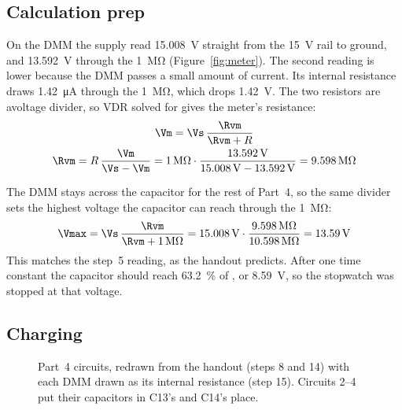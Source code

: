 \documentclass[offwhitecover]{lennylab}
\begin{document}
\subsection{Calculation prep}

On the DMM the supply read \qty{15.008}{\volt} straight from the \qty{+15}{\volt} rail to ground, and \qty{13.592}{\volt} through the \qty{1}{\mega\ohm} (Figure~\ref{fig:meter}). The second reading is lower because the DMM passes a small amount of current. Its internal resistance \Rvm{} draws \qty{1.42}{\micro\ampere} through the \qty{1}{\mega\ohm}, which drops \qty{1.42}{\volt}. The two resistors are a\pagebreak[3] voltage divider, so VDR solved for \Rvm{} gives the meter's resistance:
\begin{gather}
  \Vm = \Vs\,\frac{\Rvm}{\Rvm + R} \\
  \Rvm = R\,\frac{\Vm}{\Vs - \Vm}
       = \qty{1}{\mega\ohm} \cdot \frac{\qty{13.592}{\volt}}{\qty{15.008}{\volt} - \qty{13.592}{\volt}}
       = \qty{9.598}{\mega\ohm}
\end{gather}

The DMM stays across the capacitor for the rest of Part~4, so the same divider sets the highest voltage the capacitor can reach through the \qty{1}{\mega\ohm}:
\begin{equation}
  \Vmax = \Vs\,\frac{\Rvm}{\Rvm + \qty{1}{\mega\ohm}}
        = \qty{15.008}{\volt} \cdot \frac{\qty{9.598}{\mega\ohm}}{\qty{10.598}{\mega\ohm}}
        = \qty{13.59}{\volt}
\end{equation}
This matches the step~5 reading, as the handout predicts. After one time constant the capacitor should reach \qty{63.2}{\percent} of \Vmax{}, or \qty{8.59}{\volt}, so the stopwatch was stopped at that voltage.

\subsection{Charging}

\begin{figure}
  \par
  \vspace{15.5pt}%
  \caption{Part~4 circuits, redrawn from the handout (steps 8 and 14) with each DMM drawn as its internal resistance \Rvm{} (step 15). Circuits 2--4 put their capacitors in C13's and C14's place.}
  \label{fig:bench}
\end{figure}
\end{document}
